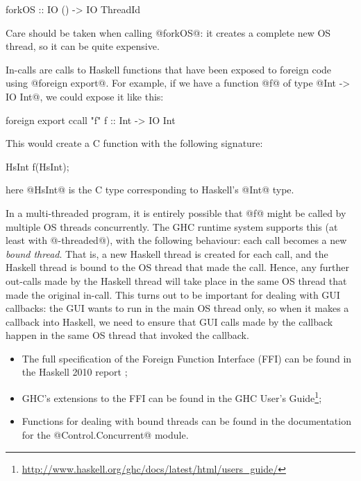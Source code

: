 \begin{haskell}
forkOS :: IO () -> IO ThreadId
\end{haskell}

\noindent Care should be taken when calling @forkOS@: it creates a
complete new OS thread, so it can be quite expensive.


In-calls are calls to Haskell functions that have been exposed to
foreign code using @foreign export@.  For example, if we have a
function @f@ of type @Int -> IO Int@, we could expose it like this:

\begin{haskell}
foreign export ccall "f" f :: Int -> IO Int
\end{haskell}

\noindent This would create a C function with the following signature:

\begin{haskell}
HsInt f(HsInt);
\end{haskell}

\noindent here @HsInt@ is the C type corresponding to Haskell's @Int@
type.

In a multi-threaded program, it is entirely possible that @f@ might be
called by multiple OS threads concurrently.  The GHC runtime system
supports this (at least with @-threaded@), with the following
behaviour: each call becomes a new \emph{bound thread}.  That is, a
new Haskell thread is created for each call, and the Haskell thread is
bound to the OS thread that made the call.  Hence, any further
out-calls made by the Haskell thread will take place in the same OS
thread that made the original in-call.  This turns out to be important
for dealing with GUI callbacks: the GUI wants to run in the main OS
thread only, so when it makes a callback into Haskell, we need to
ensure that GUI calls made by the callback happen in the same OS
thread that invoked the callback.


\begin{itemize}
\item The full specification of the Foreign Function Interface (FFI)
  can be found in the Haskell 2010 report \cite{haskell2010};
\item GHC's extensions to the FFI can be found in the GHC User's
  Guide\footnote{\url{http://www.haskell.org/ghc/docs/latest/html/users_guide/}};
\item Functions for dealing with bound threads can be found in the
  documentation for the @Control.Concurrent@ module.
\end{itemize}

